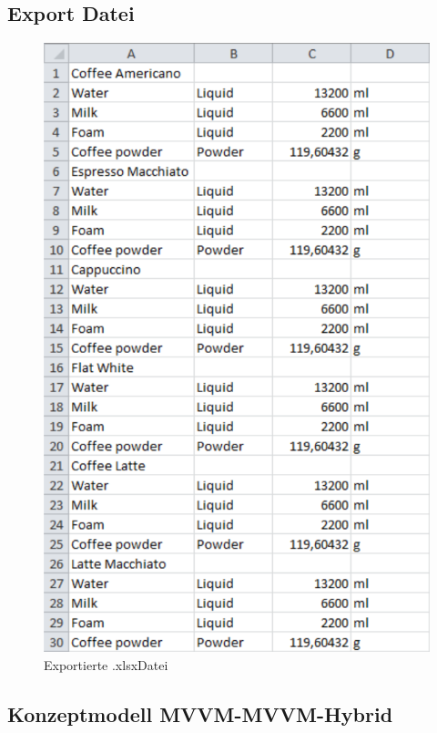\subsection{Export Datei}
\label{app:ExportDatei}

\begin{figure}[htb]
	\centering
	\includegraphics[scale=0.8]{Bilder/Export.png}
	\caption{Exportierte \glqq .xlsx\grqq \space Datei}
	\label{fig:Export}
\end{figure} 

\cleardoublepage

\subsection{Konzeptmodell MVVM-MVVM-Hybrid}
\label{app:MVVMMVVMHybrid}

